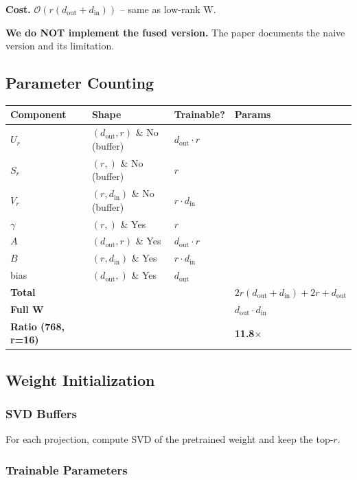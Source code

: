 \textbf{Cost.} $\mathcal{O}(r(d_\text{out} + d_\text{in}))$ -- same as low-rank W.

\textbf{We do NOT implement the fused version.} The paper documents the naive 
version and its limitation.

\subsection{Parameter Counting}

\begin{table}[H]
\centering
\small
\begin{tabular}{llll}
\toprule
\textbf{Component} & \textbf{Shape} & \textbf{Trainable?} & \textbf{Params} \\
\midrule
$U_r$ & $(d_\text{out}, r)$ \& No (buffer) & $d_\text{out} \cdot r$ \\
$S_r$ & $(r,)$ \& No (buffer) & $r$ \\
$V_r$ & $(r, d_\text{in})$ \& No (buffer) & $r \cdot d_\text{in}$ \\
$\gamma$ & $(r,)$ \& Yes & $r$ \\
$A$ & $(d_\text{out}, r)$ \& Yes & $d_\text{out} \cdot r$ \\
$B$ & $(r, d_\text{in})$ \& Yes & $r \cdot d_\text{in}$ \\
bias & $(d_\text{out},)$ \& Yes & $d_\text{out}$ \\
\textbf{Total} &  &  & $2r(d_\text{out} + d_\text{in}) + 2r + d_\text{out}$ \\
\textbf{Full W} &  &  & $d_\text{out} \cdot d_\text{in}$ \\
\textbf{Ratio (768, r=16)} &  &  & \textbf{11.8$\times$} \\
\bottomrule
\end{tabular}
\end{table}

\subsection{Weight Initialization}

\subsubsection{SVD Buffers}

For each projection, compute SVD of the pretrained weight and keep the 
top-$r$.

\subsubsection{Trainable Parameters}

